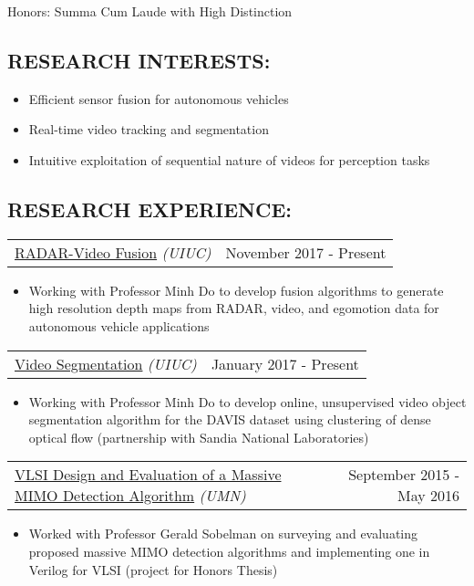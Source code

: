 \documentclass[10pt, letterpaper]{article}
\makeatletter
\newcommand{\headerrow}[2]
{\begin{tabular*}{\linewidth}{l@{\extracolsep{\fill}}r}
	#1 &
	#2 \\
\end{tabular*}}
\newcommand{\sansserif}{\cabin}
\makeatother
\begin{document}
Honors: Summa Cum Laude with High Distinction

\begin{comment}
\subsection*{\sansserif SKILLS:}
Python with TensorFlow and Caffe expeirience, ROS, MATLAB, C, C++, Microsoft Office Suite, \LaTeX
\end{comment}

\subsection*{\sansserif RESEARCH INTERESTS:}
\begin{itemize}
	\item Efficient sensor fusion for autonomous vehicles
	\item Real-time video tracking and segmentation
	\item Intuitive exploitation of sequential nature of videos for perception tasks
\end{itemize}

\subsection*{\sansserif RESEARCH EXPERIENCE:}

\headerrow
    {\uline{RADAR-Video Fusion} \textit{(UIUC)}}
    {November 2017 - Present}
    \begin{itemize}
        \item
        Working with Professor Minh Do to develop fusion algorithms to generate high resolution depth maps from RADAR, video, and egomotion data for autonomous vehicle applications
    \end{itemize}

\headerrow
	{\uline{Video Segmentation} \textit{(UIUC)}}
	{January 2017 - Present}
	\begin{itemize}
		\item
		Working with Professor Minh Do to develop online, unsupervised video object segmentation algorithm for the DAVIS dataset using clustering of dense optical flow (partnership with Sandia National Laboratories)	
	\end{itemize}

\headerrow
	{\uline{VLSI Design and Evaluation of a Massive MIMO Detection Algorithm} \textit{(UMN)}}
	{September 2015 - May 2016}
	\begin{itemize}
		\item
		Worked with Professor Gerald Sobelman on surveying and evaluating proposed massive MIMO detection algorithms and implementing one in Verilog for VLSI (project for Honors Thesis) 
	\end{itemize}
\end{document}
